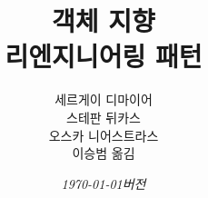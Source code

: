 \documentclass[a4paper,10pt,twoside]{book}
\begin{document}
\frontmatter
\setcounter{page}{1}
\pagestyle{headings}
\author{
	세르게이 디마이어\\[1ex]
	스테판 뒤카스\\[1ex]
	오스카 니어스트라스\\[1ex]
	이승범 옮김
}
\title{\Huge\bf 객체 지향\\ 리엔지니어링 패턴}
\isodate
\date{\emph{\today 버전}}
\maketitle
\cleardoublepage

\markboth{}{}
\newpage
~ %
\vfill
\end{document}
